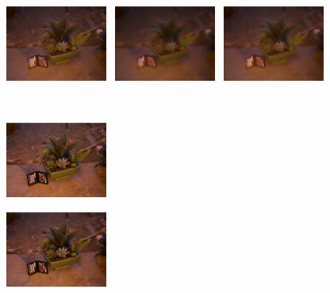 \begin{figure}[tb]
\begin{minipage}[b]{0.24\hsize}
	\end{minipage}
	\begin{minipage}[b]{0.24\hsize}
			\centering
			\includegraphics[width=35mm, height = 25mm]{images/experiment/parameter/illumination/0.001-0.01.eps}
	\end{minipage}
	\begin{minipage}[b]{0.24\hsize}
			\centering
			\includegraphics[width=35mm, height = 25mm]{images/experiment/parameter/illumination/0.01-0.001.eps}
	\end{minipage}
	\begin{minipage}[b]{0.24\hsize}
			\centering
			\includegraphics[width=35mm, height = 25mm]{images/experiment/parameter/illumination/0.01-0.01.eps}
	\end{minipage}\\
	\vspace{3mm}
	\begin{minipage}[b]{0.24\hsize}
			\centering
			\includegraphics[width=35mm, height = 25mm]{images/experiment/parameter/output/0.001-0.001.eps}
			 \label{fig:parameter/qualitative/0001-0001}
	\end{minipage}
	\begin{minipage}[b]{0.24\hsize}
			\centering
			\includegraphics[width=35mm, height = 25mm]{images/experiment/parameter/output/0.001-0.01.eps}

\end{minipage}
\end{figure}
